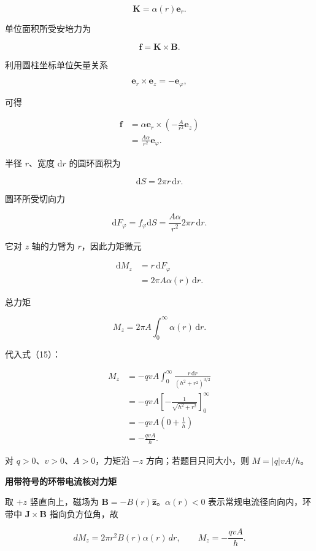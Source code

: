\documentclass[12pt,a4paper,UTF8]{ctexart}
\begin{document}
\[
\bm K=\alpha(r)\bm e_r.
\tag{17}
\]

单位面积所受安培力为

\[
\bm f=\bm K\times\bm B.
\tag{18}
\]

利用圆柱坐标单位矢量关系

\[
\bm e_r\times\bm e_z=-\bm e_\varphi,
\]

可得

\[
\begin{aligned}
\bm f
&=\alpha\bm e_r\times
\left(-\frac A{r^2}\bm e_z\right)\\
&=\frac{A\alpha}{r^2}\bm e_\varphi.
\end{aligned}
\tag{19}
\]

半径 \(r\)、宽度 \(\mathrm dr\) 的圆环面积为

\[
\mathrm dS=2\pi r\,\mathrm dr.
\tag{20}
\]

圆环所受切向力

\[
\mathrm dF_\varphi
=f_\varphi\mathrm dS
=\frac{A\alpha}{r^2}2\pi r\,\mathrm dr.
\tag{21}
\]

它对 \(z\) 轴的力臂为 \(r\)，因此力矩微元

\[
\begin{aligned}
\mathrm dM_z
&=r\,\mathrm dF_\varphi\\
&=2\pi A\alpha(r)\,\mathrm dr.
\end{aligned}
\tag{22}
\]

总力矩

\[
M_z=2\pi A\int_0^\infty\alpha(r)\,\mathrm dr.
\tag{23}
\]

代入式（15）：

\[
\begin{aligned}
M_z
&=-qvA\int_0^\infty
\frac{r\,\mathrm dr}{(h^2+r^2)^{3/2}}\\
&=-qvA\left[-\frac1{\sqrt{h^2+r^2}}\right]_0^\infty\\
&=-qvA\left(0+\frac1h\right)\\
&=\boxed{-\frac{qvA}{h}}.
\end{aligned}
\tag{24}
\]

对 \(q>0\)、\(v>0\)、\(A>0\)，力矩沿 \(-z\) 方向；若题目只问大小，则
\(\boxed{M=|q|vA/h}\)。

\textbf{用带符号的环带电流核对力矩}

取 \(+z\) 竖直向上，磁场为 \(\bm B=-B(r)\hat{\bm z}\)。\(\alpha(r)<0\)
表示常规电流径向向内，环带中 \(\bm J\times\bm B\) 指向负方位角，故

\[dM_z=2\pi r^2B(r)\alpha(r)\,dr,\qquad M_z=-\frac{qvA}{h}.\]
\end{document}

